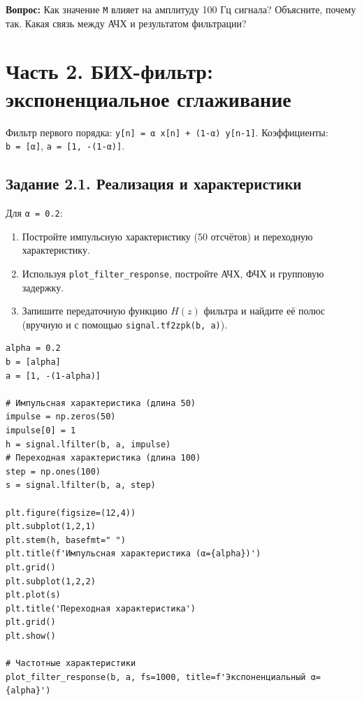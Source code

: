 \documentclass[12pt,a4paper,openany]{book}
\providecommand{\tightlist}{\setlength{\itemsep}{0pt}\setlength{\parskip}{0pt}}
\begin{document}
\textbf{Вопрос:} Как значение \texttt{M} влияет на амплитуду 100 Гц сигнала? Объясните, почему так. Какая связь между АЧХ и результатом фильтрации?

\section*{Часть 2. БИХ-фильтр: экспоненциальное сглаживание}

Фильтр первого порядка: \texttt{y{[}n{]}\ =\allowbreak{}\ α\ x{[}n{]}\ +\ (\allowbreak{}1-α)\ y{[}n-1{]}}. Коэффициенты: \texttt{b\ =\allowbreak{}\ {[}α{]}}, \texttt{a\ =\allowbreak{}\ {[}1,\allowbreak{}\ -(\allowbreak{}1-α){]}}.

\subsection*{Задание 2.1. Реализация и характеристики}

Для \texttt{α\ =\allowbreak{}\ 0.\allowbreak{}2}:

\begin{enumerate}
\def\labelenumi{\arabic{enumi}.}
\tightlist
\item
  Постройте импульсную характеристику (50 отсчётов) и переходную характеристику.
\item
  Используя \texttt{plot\_\allowbreak{}filter\_\allowbreak{}response}, постройте АЧХ, ФЧХ и групповую задержку.
\item
  Запишите передаточную функцию \(H(z)\) фильтра и найдите её полюс (вручную и с помощью \texttt{signal.\allowbreak{}tf2zpk(\allowbreak{}b,\allowbreak{}\ a)}).
\end{enumerate}

\begin{Verbatim}[fontsize=\small, breaklines, breakanywhere, frame=single, framesep=2mm]
alpha = 0.2
b = [alpha]
a = [1, -(1-alpha)]

# Импульсная характеристика (длина 50)
impulse = np.zeros(50)
impulse[0] = 1
h = signal.lfilter(b, a, impulse)
# Переходная характеристика (длина 100)
step = np.ones(100)
s = signal.lfilter(b, a, step)

plt.figure(figsize=(12,4))
plt.subplot(1,2,1)
plt.stem(h, basefmt=" ")
plt.title(f'Импульсная характеристика (α={alpha})')
plt.grid()
plt.subplot(1,2,2)
plt.plot(s)
plt.title('Переходная характеристика')
plt.grid()
plt.show()

# Частотные характеристики
plot_filter_response(b, a, fs=1000, title=f'Экспоненциальный α={alpha}')
\end{Verbatim}
\end{document}
